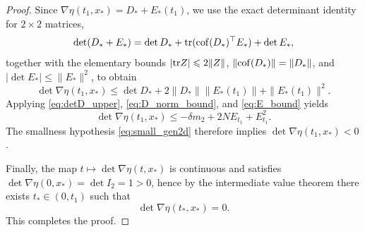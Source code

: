\documentclass[11pt]{amsart}
\numberwithin{equation}{section}
\theoremstyle{definition}
\theoremstyle{remark}
\numberwithin{equation}{section}
\newcommand{\tr}{{\rm tr}}
\newcommand{\cof}{{\rm cof}}
\renewcommand{\le}{\leqslant}
\begin{document}
\begin{proof}
Since $\nabla\eta(t_1,x_*)=D_*+E_*(t_1)$, we use the exact determinant identity for $2\times2$ matrices,
\[
\det(D_*+E_*)=\det D_*+\tr(\cof(D_*)^\top E_*)+\det E_*,
\]
together with the elementary bounds $|\tr Z|\le2\|Z\|$, $\|\cof(D_*)\|=\|D_*\|$, and $|\det E_*|\le\|E_*\|^2$, to obtain
\[
\det\nabla\eta(t_1,x_*) \le \det D_*+2\|D_*\| \|E_*(t_1)\|+\|E_*(t_1)\|^2.
\]
Applying \eqref{eq:detD_upper}, \eqref{eq:D_norm_bound}, and \eqref{eq:E_bound} yields
\[
\det\nabla\eta(t_1,x_*) \le -\delta m_2 + 2N E_{t_1}+E_{t_1}^2.
\]
The smallness hypothesis \eqref{eq:small_gen2d} therefore implies $\det\nabla\eta(t_1,x_*)<0$.

Finally, the map $t\mapsto\det\nabla\eta(t,x_*)$ is continuous and satisfies $\det\nabla\eta(0,x_*)=\det I_2=1>0$, hence by the intermediate value theorem there exists $t_*\in(0,t_1)$ such that 
\[
\det\nabla\eta(t_*,x_*)=0.
\]
This completes the proof.
\end{proof}
 
\end{document}
